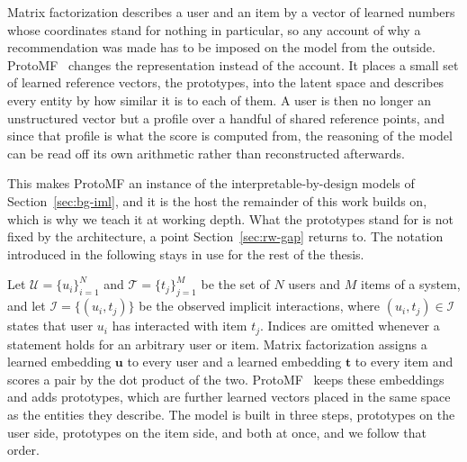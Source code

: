 Matrix factorization describes a user and an item by a vector of learned
numbers whose coordinates stand for nothing in particular, so any account of
why a recommendation was made has to be imposed on the model from the outside.
ProtoMF~\cite{melchiorre2022protomf} changes the representation instead of the
account. It places a small set of learned reference vectors, the prototypes,
into the latent space and describes every entity by how similar it is to each
of them. A user is then no longer an unstructured vector but a profile over a
handful of shared reference points, and since that profile is what the score is
computed from, the reasoning of the model can be read off its own arithmetic
rather than reconstructed afterwards.

This makes ProtoMF an instance of the interpretable-by-design models of
Section~\ref{sec:bg-iml}, and it is the host the remainder of this work builds
on, which is why we teach it at working depth. What the prototypes stand for is
not fixed by the architecture, a point Section~\ref{sec:rw-gap} returns to. The
notation introduced in the following stays in use for the rest of the thesis.

Let $\mathcal{U} = \{u_i\}_{i=1}^{N}$ and $\mathcal{T} = \{t_j\}_{j=1}^{M}$ be
the set of $N$ users and $M$ items of a system, and let
$\mathcal{I} = \{(u_i, t_j)\}$ be the observed implicit interactions, where
$(u_i, t_j) \in \mathcal{I}$ states that user $u_i$ has interacted with item
$t_j$. Indices are omitted whenever a statement holds for an arbitrary user or
item. Matrix factorization assigns a learned embedding $\mathbf{u}$ to every
user and a learned embedding $\mathbf{t}$ to every item and scores a pair by
the dot product of the two. ProtoMF~\cite{melchiorre2022protomf} keeps these
embeddings and adds prototypes, which are further learned vectors placed in
the same space as the entities they describe. The model is built in three
steps, prototypes on the user side, prototypes on the item side, and both at
once, and we follow that order.

